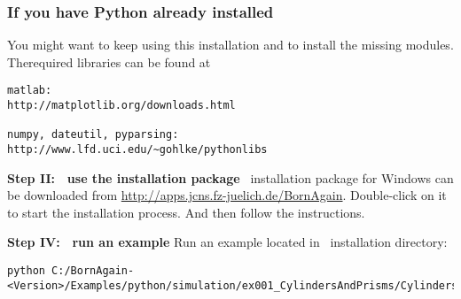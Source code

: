 \subsubsection{If you have Python already installed}
You might want to keep using this installation and to install the missing modules. Therequired libraries can be found at
\begin{lstlisting}[language=shell, style=commandline]
matlab:
http://matplotlib.org/downloads.html

numpy, dateutil, pyparsing:
http://www.lfd.uci.edu/~gohlke/pythonlibs
\end{lstlisting}


\noindent
{\bf Step II: $~$ use the installation package } \newline
\BornAgain\ installation package for Windows can be downloaded from \url{http://apps.jcns.fz-juelich.de/BornAgain}.
Double-click on it to start the installation process. And then follow the instructions.
\vspace*{2mm}

\noindent
{\bf Step IV: $~$ run an example} \newline
Run an example located in \BornAgain\ installation directory:
\begin{lstlisting}[language=shell, style=commandline]
python C:/BornAgain-<Version>/Examples/python/simulation/ex001_CylindersAndPrisms/CylindersAndPrisms.py
\end{lstlisting}





